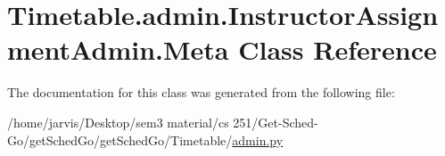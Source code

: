 \hypertarget{classTimetable_1_1admin_1_1InstructorAssignmentAdmin_1_1Meta}{}\section{Timetable.\+admin.\+Instructor\+Assignment\+Admin.\+Meta Class Reference}
\label{classTimetable_1_1admin_1_1InstructorAssignmentAdmin_1_1Meta}


The documentation for this class was generated from the following file\+:\begin{DoxyCompactItemize}
\item 
/home/jarvis/\+Desktop/sem3 material/cs 251/\+Get-\/\+Sched-\/\+Go/get\+Sched\+Go/get\+Sched\+Go/\+Timetable/\hyperlink{Timetable_2admin_8py}{admin.\+py}\end{DoxyCompactItemize}
